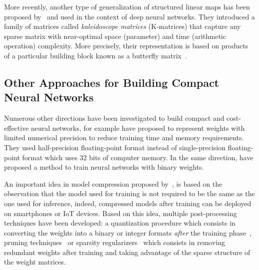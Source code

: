 \drawstar

More recently, another type of generalization of structured linear maps has been proposed by~\citet{dao2020kaleidoscope} and used in the context of deep neural networks.
They introduced a family of matrices called \emph{kaleidoscope matrices} (K-matrices) that capture any sparse matrix with near-optimal space (parameter) and time (arithmetic operation) complexity.
More precisely, their representation is based on products of a particular building block known as a butterfly matrix~\cite{parker1995random,dao2019learning}.





\subsection{Other Approaches for Building Compact Neural Networks}
\label{subsection:ch3-other_approaches_for_building_compact_neural_networks}


Numerous other directions have been investigated to build compact and cost-effective neural networks, for example \citet{gupta2015deep,micikevicius2018mixed} have proposed to represent weights with limited numerical precision to reduce training time and memory requirements.
They used half-precision floating-point format instead of single-precision floating-point format which uses 32 bits of computer memory.
In the same direction, \citet{courbariaux2015binaryconnect} have proposed a method to train neural networks with binary weights.

An important idea in model compression proposed by~\citet{bucilua2006model}, is based on the observation that the model used for training is not required to be the same as the one used for inference, indeed, compressed models after training can be deployed on smartphones or IoT devices.
Based on this idea, multiple post-processing techniques have been developed: a quantization procedure which consists in converting the weights into a binary or integer formats \emph{after} the training phase~\cite{mellempudi2017ternary,rastegariECCV16}, pruning techniques~\cite{dai2018compressing,han2015deep,lin2017runtime} or sparsity regularizers~\cite{collins2014memory,dai2018compressing,liu2015sparse} which consists in removing redundant weights after training and taking advantage of the sparse structure of the weight matrices.

